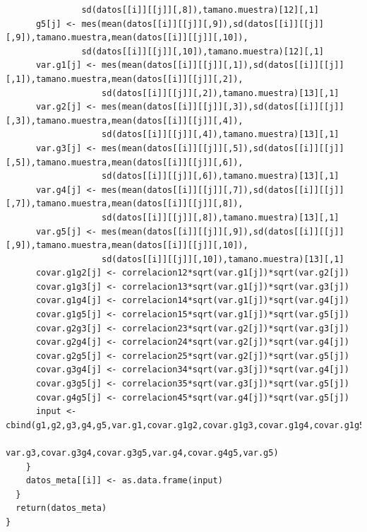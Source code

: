 \documentclass[a4paper,openright,12pt]{report}
\begin{document}
{\begin{verbatim}
               sd(datos[[i]][[j]][,8]),tamano.muestra)[12][,1]
      g5[j] <- mes(mean(datos[[i]][[j]][,9]),sd(datos[[i]][[j]][,9]),tamano.muestra,mean(datos[[i]][[j]][,10]),
               sd(datos[[i]][[j]][,10]),tamano.muestra)[12][,1]
      var.g1[j] <- mes(mean(datos[[i]][[j]][,1]),sd(datos[[i]][[j]][,1]),tamano.muestra,mean(datos[[i]][[j]][,2]),
                   sd(datos[[i]][[j]][,2]),tamano.muestra)[13][,1]
      var.g2[j] <- mes(mean(datos[[i]][[j]][,3]),sd(datos[[i]][[j]][,3]),tamano.muestra,mean(datos[[i]][[j]][,4]),
                   sd(datos[[i]][[j]][,4]),tamano.muestra)[13][,1]
      var.g3[j] <- mes(mean(datos[[i]][[j]][,5]),sd(datos[[i]][[j]][,5]),tamano.muestra,mean(datos[[i]][[j]][,6]),
                   sd(datos[[i]][[j]][,6]),tamano.muestra)[13][,1]
      var.g4[j] <- mes(mean(datos[[i]][[j]][,7]),sd(datos[[i]][[j]][,7]),tamano.muestra,mean(datos[[i]][[j]][,8]),
                   sd(datos[[i]][[j]][,8]),tamano.muestra)[13][,1]
      var.g5[j] <- mes(mean(datos[[i]][[j]][,9]),sd(datos[[i]][[j]][,9]),tamano.muestra,mean(datos[[i]][[j]][,10]),
                   sd(datos[[i]][[j]][,10]),tamano.muestra)[13][,1]
      covar.g1g2[j] <- correlacion12*sqrt(var.g1[j])*sqrt(var.g2[j])
      covar.g1g3[j] <- correlacion13*sqrt(var.g1[j])*sqrt(var.g3[j])
      covar.g1g4[j] <- correlacion14*sqrt(var.g1[j])*sqrt(var.g4[j])
      covar.g1g5[j] <- correlacion15*sqrt(var.g1[j])*sqrt(var.g5[j])
      covar.g2g3[j] <- correlacion23*sqrt(var.g2[j])*sqrt(var.g3[j])
      covar.g2g4[j] <- correlacion24*sqrt(var.g2[j])*sqrt(var.g4[j])
      covar.g2g5[j] <- correlacion25*sqrt(var.g2[j])*sqrt(var.g5[j])
      covar.g3g4[j] <- correlacion34*sqrt(var.g3[j])*sqrt(var.g4[j])
      covar.g3g5[j] <- correlacion35*sqrt(var.g3[j])*sqrt(var.g5[j])
      covar.g4g5[j] <- correlacion45*sqrt(var.g4[j])*sqrt(var.g5[j])
      input <- cbind(g1,g2,g3,g4,g5,var.g1,covar.g1g2,covar.g1g3,covar.g1g4,covar.g1g5,var.g2,covar.g2g3,covar.g2g4,covar.g2g5,
                     var.g3,covar.g3g4,covar.g3g5,var.g4,covar.g4g5,var.g5)
    }
    datos_meta[[i]] <- as.data.frame(input)
  }
  return(datos_meta)
}
\end{verbatim}}
\end{document}
